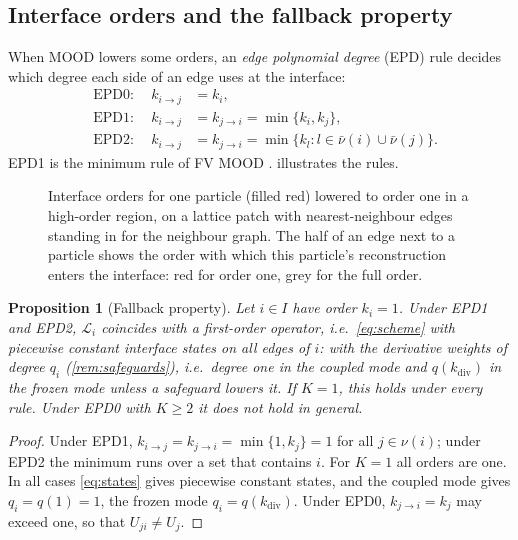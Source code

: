 \documentclass[11pt,a4paper]{article}
\theoremstyle{plain}
\newtheorem{proposition}[theorem]{Proposition}
\theoremstyle{definition}
\theoremstyle{remark}
\numberwithin{equation}{section}
\newcommand{\nb}{\nu}
\newcommand{\cnb}{\bar\nu}
\newcommand{\Lop}{\mathcal{L}}
\newcommand{\ord}[2]{k_{#1\to #2}}
\newcommand{\qdiv}{q}
\begin{document}
\subsection{Interface orders and the fallback property}\label{sec:epd}

When MOOD lowers some orders, an \emph{edge polynomial degree} (EPD) rule decides which degree each side of an edge uses at the interface:
\begin{equation}\label{eq:epd}
\begin{aligned}
&\text{EPD0:}&\ \ \ord ij&=k_i,\\
&\text{EPD1:}&\ \ \ord ij&=\ord ji=\min\{k_i,k_j\},\\
&\text{EPD2:}&\ \ \ord ij&=\ord ji=\min\{k_l: l\in\cnb(i)\cup\cnb(j)\}.
\end{aligned}
\end{equation}
EPD1 is the minimum rule of FV MOOD \cite{Clain2011,Diot2012}.  illustrates the rules.

\begin{figure}[t]
\centering

\caption{Interface orders for one particle (filled red) lowered to order one in a high-order region, on a lattice patch with nearest-neighbour edges standing in for the neighbour graph. The half of an edge next to a particle shows the order with which this particle's reconstruction enters the interface: red for order one, grey for the full order.}\label{fig:epd}
\end{figure}

\begin{proposition}[Fallback property]\label{prop:fallback}
Let $i\in I$ have order $k_i=1$. Under EPD1 and EPD2, $\Lop_i$ coincides with a first-order operator, i.e.\ \eqref{eq:scheme} with piecewise constant interface states on all edges of $i$: with the derivative weights of degree $q_i$ (\cref{rem:safeguards}), i.e.\ degree one in the coupled mode and $\qdiv(k_{\mathrm{div}})$ in the frozen mode unless a safeguard lowers it. If $K=1$, this holds under every rule. Under EPD0 with $K\ge2$ it does not hold in general.
\end{proposition}

\begin{proof}
Under EPD1, $\ord ij=\ord ji=\min\{1,k_j\}=1$ for all $j\in\nb(i)$; under EPD2 the minimum runs over a set that contains $i$. For $K=1$ all orders are one. In all cases \eqref{eq:states} gives piecewise constant states, and the coupled mode gives $q_i=\qdiv(1)=1$, the frozen mode $q_i=\qdiv(k_{\mathrm{div}})$. Under EPD0, $\ord ji=k_j$ may exceed one, so that $U_{ji}\ne U_j$.
\end{proof}
\end{document}
